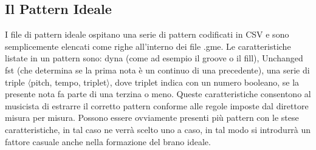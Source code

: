 \subsection{Il Pattern Ideale}
I file di pattern ideale ospitano una serie di pattern codificati in CSV e sono semplicemente elencati come righe all'interno dei file .gme.
Le caratteristiche listate in un pattern sono: dyna (come ad esempio il groove o il fill), Unchanged fst (che determina se la prima nota è un continuo di una precedente), una serie di triple $\langle$pitch, tempo, triplet$\rangle$, dove triplet indica con un numero booleano, se la presente nota fa parte di una terzina o meno.
Queste caratteristiche consentono al musicista di estrarre il corretto pattern conforme alle regole imposte dal direttore misura per misura.
Possono essere ovviamente presenti più pattern con le stese caratteristiche, in tal caso ne verrà scelto uno a caso, in tal modo si introdurrà un fattore casuale anche nella formazione del brano ideale.